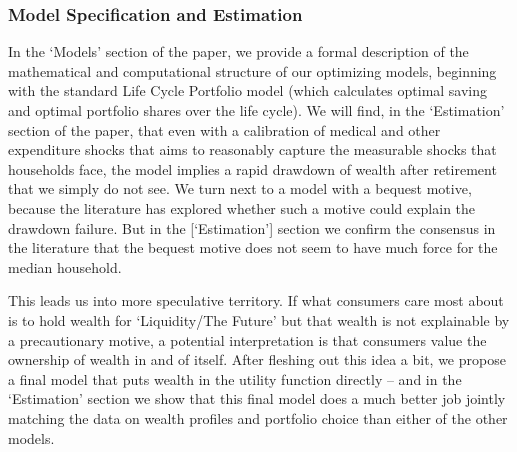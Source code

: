 \documentclass{article}
\begin{document}

\subsubsection{Model Specification and Estimation}

In the `Models' section of the paper, we provide a formal description of the mathematical and computational structure of our optimizing models, beginning with the standard Life Cycle Portfolio model (which calculates optimal saving and optimal portfolio shares over the life cycle).  We will find, in the ‘Estimation’ section of the paper, that even with a calibration of medical and other expenditure shocks that aims to reasonably capture the measurable shocks that households face, the model implies a rapid drawdown of wealth after retirement that we simply do not see.  We turn next to a model with a bequest motive, because the literature has explored whether such a motive could explain the drawdown failure.  But in the [`Estimation'] section we confirm the consensus in the literature that the bequest motive does not seem to have much force for the median household.

This leads us into more speculative territory.  If what consumers care most about is to hold wealth for `Liquidity/The Future' but that wealth is not explainable by a precautionary motive, a potential interpretation is that consumers value the ownership of wealth in and of itself.  After fleshing out this idea a bit, we propose a final model that puts wealth in the utility function directly -- and in the `Estimation' section we show that this final model does a much better job jointly matching the data on wealth profiles and portfolio choice than either of the other models.


\end{document}
